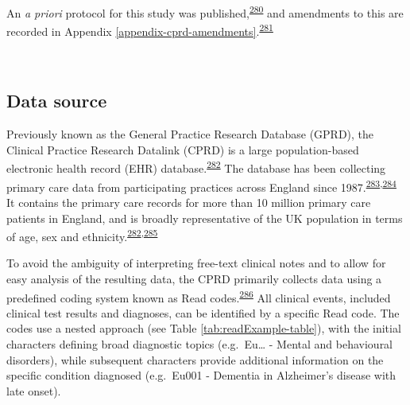 \documentclass[a4paper, twoside]{templates/ociamthesis}
\begin{document}
An \emph{a priori} protocol for this study was published,\textsuperscript{\protect\hyperlink{ref-walker2016}{280}} and amendments to this are recorded in Appendix \ref{appendix-cprd-amendments}.\textsuperscript{\protect\hyperlink{ref-vonelm2008}{281}}

~

\hypertarget{cprd-data-source}{%
\subsection{Data source}\label{cprd-data-source}}

Previously known as the General Practice Research Database (GPRD), the Clinical Practice Research Datalink (CPRD) is a large population-based electronic health record (EHR) database.\textsuperscript{\protect\hyperlink{ref-herrett2015}{282}} The database has been collecting primary care data from participating practices across England since 1987.\textsuperscript{\protect\hyperlink{ref-williams2012}{283},\protect\hyperlink{ref-wood2001revitalizing}{284}} It contains the primary care records for more than 10 million primary care patients in England, and is broadly representative of the UK population in terms of age, sex and ethnicity.\textsuperscript{\protect\hyperlink{ref-herrett2015}{282},\protect\hyperlink{ref-mathur2014}{285}}

To avoid the ambiguity of interpreting free-text clinical notes and to allow for easy analysis of the resulting data, the CPRD primarily collects data using a predefined coding system known as Read codes.\textsuperscript{\protect\hyperlink{ref-booth1994}{286}} All clinical events, included clinical test results and diagnoses, can be identified by a specific Read code. The codes use a nested approach (see Table \ref{tab:readExample-table}), with the initial characters defining broad diagnostic topics (e.g.~Eu\ldots{} - Mental and behavioural disorders), while subsequent characters provide additional information on the specific condition diagnosed (e.g.~Eu001 - Dementia in Alzheimer's disease with late onset).

~
\end{document}
